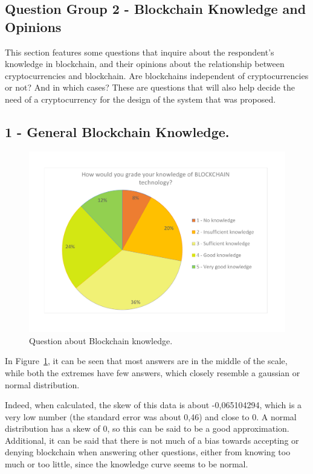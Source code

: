 
\subsection{Question Group 2 - Blockchain Knowledge and Opinions}

This section features some questions that inquire about the respondent's knowledge in blockchain, and their opinions about the relationship between cryptocurrencies and blockchain. Are blockchains independent of cryptocurrencies or not? And in which cases? These are questions that will also help decide the need of a cryptocurrency for the design of the system that was proposed.

\subsection*{1 - General Blockchain Knowledge.}
 \begin{figure}[h]
\centering
\includegraphics[scale=0.65]{media/survey_group2/blockchain_knowledge.pdf}
\caption{Question about Blockchain knowledge.}
\label{fig:blockchain_knowledge}
\end{figure}

In Figure~\ref{fig:blockchain_knowledge}, it can be seen that most answers are in the middle of the scale, while both the extremes have few answers, which closely resemble a gaussian or normal distribution. 

Indeed, when calculated, the skew of this data is about -0,065104294, which is a very low number (the standard error was about 0,46) and close to 0. A normal distribution has a skew of 0, so this can be said to be a good approximation. Additional, it can be said that there is not much of a bias towards accepting or denying blockchain when answering other questions, either from knowing too much or too little, since the knowledge curve seems to be normal.
 

